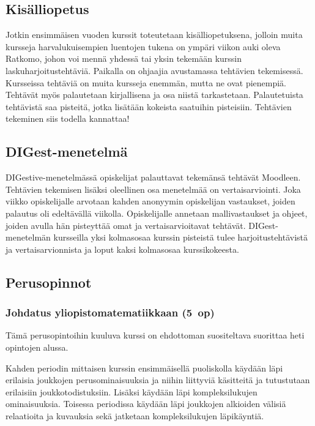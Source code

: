 \documentclass[../ala_hataile.tex]{subfiles}
\begin{document}
	\subsection*{Kisälliopetus}
	Jotkin ensimmäisen vuoden kurssit toteutetaan
	kisälliopetuksena, jolloin muita
	kursseja harvalukuisempien luentojen tukena
	on ympäri viikon auki oleva Ratkomo,
	johon voi mennä yhdessä tai yksin tekemään
	kurssin laskuharjoitustehtäviä.
	Paikalla on ohjaajia avustamassa tehtävien
	tekemisessä. Kursseissa tehtäviä on
	muita kursseja enemmän, mutta ne ovat
	pienempiä. Tehtävät myös palautetaan kirjallisena
	ja osa niistä tarkastetaan.
	Palautetuista tehtävistä saa pisteitä, jotka
	lisätään kokeista saatuihin pisteisiin.
	Tehtävien tekeminen siis todella kannattaa!
	
\subsection*{DIGest-menetelmä}
	
	DIGestive-menetelmässä opiskelijat palauttavat tekemänsä tehtävät Moodleen. Tehtävien tekemisen lisäksi oleellinen osa menetelmää on vertais\-arviointi. Joka viikko opiskelijalle arvotaan kahden anonyymin opiskelijan vastaukset, joiden palautus oli edeltävällä viikolla. Opiskelijalle annetaan malli\-vastaukset ja ohjeet, joiden avulla hän pisteyttää omat ja vertaisarvioitavat tehtävät. DIGest-menetelmän kursseilla yksi kolmas\-osaa kurssin pisteistä tulee harjoitus\-tehtävistä ja vertais\-arvionnista ja loput kaksi kolmas\-osaa kurssi\-kokeesta.
	
	\subsection*{Perusopinnot}
	\subsubsection*{Johdatus yliopistomatematiikkaan (5~op)}
	Tämä perusopintoihin kuuluva kurssi
	on ehdottoman suositeltava suorittaa heti
	opintojen alussa.
	
	Kahden periodin mittaisen kurssin ensimmäisellä
	puoliskolla käydään läpi erilaisia
	joukkojen perusominaisuuksia ja niihin
	liittyviä käsitteitä ja tutustutaan erilaisiin
	joukkotodistuksiin. Lisäksi käydään läpi
	kompleksilukujen ominaisuuksia. Toisessa
	periodissa käydään läpi joukkojen alkioiden
	välisiä relaatioita ja kuvauksia sekä jatketaan
	kompleksilukujen läpikäyntiä.
	
\end{document}
